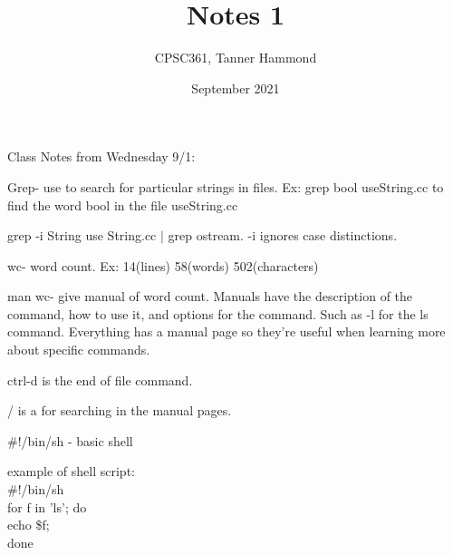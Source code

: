 \documentclass{article}
\title{Notes 1}
\author{CPSC361,
        Tanner Hammond}
\date{September 2021}
\begin{document}
\maketitle

Class Notes from Wednesday 9/1:

Grep- use to search for particular strings in files. Ex: grep bool useString.cc to find the word bool in the file useString.cc

grep -i String use String.cc $|$ grep ostream. -i ignores case distinctions.

wc- word count. Ex: 14(lines) 58(words) 502(characters)

man wc- give manual of word count. Manuals have the description of the command, how to use it, and options for the command. Such as -l for the ls command. Everything has a manual page so they're useful when learning more about specific commands.

ctrl-d is the end of file command.

/ is a for searching in the manual pages.

$\#$!/bin/sh - basic shell

example of shell script:\\
#!/bin/sh\\
    for f in 'ls'; do\\
    echo \$f;\\
done
\end{document}
